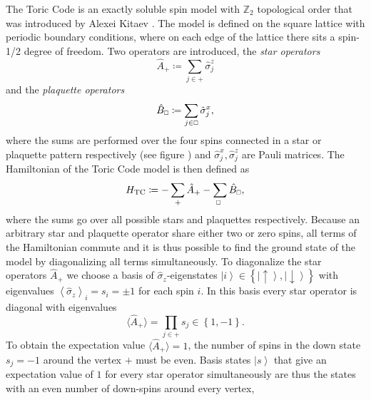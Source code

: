 The Toric Code is an exactly soluble spin model with $\mathbb{Z}_2$ topological order that was introduced by Alexei Kitaev \cite{cite:fault_tolerant_quantum_computation_by_anyons}. The model is defined on the square lattice with periodic boundary conditions, where on each edge of the lattice there sits a spin-1/2 degree of freedom. Two operators are introduced, the \textit{star operators}
\begin{equation}
	\label{eq:star_operator}
	\hat{A}_+ \coloneqq \sum_{j\in+}\hat{\sigma}_j^z
\end{equation}
and the \textit{plaquette operators}
\begin{equation}
	\label{eq:plaquette_operator}
	\hat{B}_{\scalebox{0.6}{$\square$}} \coloneqq \sum_{j\in \scalebox{0.6}{$\square$}} \hat{\sigma}_j^x,
\end{equation}
where the sums are performed over the four spins connected in a star or plaquette pattern respectively (see figure ) and $\hat{\sigma}_j^x, \hat{\sigma}_j^z$ are Pauli matrices. The Hamiltonian of the Toric Code model is then defined as
\begin{equation}
	\label{eq:toric_code_hamiltonian}
	H_\text{TC} \coloneqq -\sum_+\hat{A}_+ - \sum_{\scalebox{0.6}{$\square$}}\hat{B}_{\scalebox{0.6}{$\square$}},
\end{equation}
where the sums go over all possible stars and plaquettes respectively. Because an arbitrary star and plaquette operator share either two or zero spins, all terms of the Hamiltonian commute and it is thus possible to find the ground state of the model by diagonalizing all terms simultaneously. To diagonalize the star operators $\hat{A}_+$ we choose a basis of $\hat{\sigma}_z$-eigenstates $\left|i\right\rangle \in \left\{\left|\uparrow\right\rangle, \left|\downarrow\right\rangle\right\}$ with eigenvalues $\left\langle\hat{\sigma}_z\right\rangle_i = s_i = \pm 1$ for each spin $i$. In this basis every star operator is diagonal with eigenvalues
\begin{equation}
	\label{eq:toric_code_star_operator_expectation value}
	\langle \hat{A}_+\rangle = \prod_{j\in+}s_j \in \left\{1, -1\right\}.
\end{equation}
To obtain the expectation value $\langle \hat{A}_+\rangle = 1$, the number of spins in the down state $s_j = -1$ around the vertex $+$ must be even. Basis states $\left|s\right\rangle$ that give an expectation value of $1$ for every star operator simultaneously are thus the states with an even number of down-spins around every vertex,
